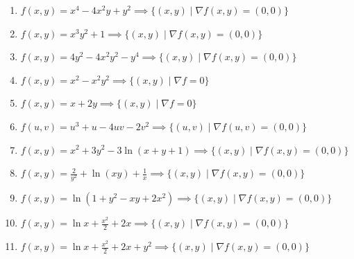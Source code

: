 \documentclass[11pt,a4paper]{article}
\begin{document}
\begin{enumerate}
\item $\displaystyle f(x, y) = x^{4} - 4x^{2} y + y^{2} \implies \{(x, y) \mid \nabla f(x, y) = (0, 0)\}$
\item $\displaystyle f(x, y) = x^{3} y^{2} + 1 \implies \{(x, y) \mid \nabla f(x, y) = (0, 0)\}$
\item $\displaystyle f(x, y) = 4y^{2} - 4x^{2} y^{2} - y^{4} \implies \{(x, y) \mid \nabla f(x, y) = (0, 0)\}$
\item $\displaystyle f(x, y) = x^{2} - x^{2} y^{2} \implies \{(x, y) \mid \nabla f = 0\}$
\item $\displaystyle f(x, y) = x + 2y \implies \{(x, y) \mid \nabla f = 0\}$
\item $\displaystyle f(u, v) = u^{3} + u - 4uv - 2v^{2} \implies \{(u, v) \mid \nabla f(u, v) = (0, 0)\}$
\item $\displaystyle f(x, y) = x^{2} + 3y^{2} - 3\ln(x + y + 1) \implies \{(x, y) \mid \nabla f(x, y) = (0, 0)\}$
\item $\displaystyle f(x, y) = \frac{2}{y^{2}} + \ln(xy) + \frac{1}{x} \implies \{(x, y) \mid \nabla f(x, y) = (0, 0)\}$
\item $\displaystyle f(x, y) = \ln(1 + y^{2} - xy + 2x^{2}) \implies \{(x, y) \mid \nabla f(x, y) = (0, 0)\}$
\item $\displaystyle f(x, y) = \ln x + \frac{x^{2}}{2} + 2x \implies \{(x, y) \mid \nabla f(x, y) = (0, 0)\}$
\item $\displaystyle f(x, y) = \ln x + \frac{x^{2}}{2} + 2x + y^{2} \implies \{(x, y) \mid \nabla f(x, y) = (0, 0)\}$
\end{enumerate}
\end{document}
